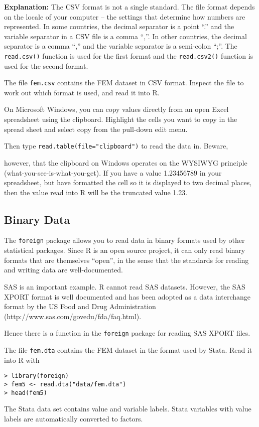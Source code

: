 \documentclass[12pt]{article}
\begin{document}
\textbf{Explanation:} The CSV format is not a single standard. The file format depends on
the locale of your computer – the settings that determine how numbers are
represented. In some countries, the decimal separator is a point “.” and the variable
separator in a CSV file is a comma “,”. In other countries, the decimal separator is a
comma “,” and the variable separator is a semi-colon “;”. The \texttt{read.csv()} function is
used for the first format and the \texttt{read.csv2()} function is used for the second format.


The file \texttt{fem.csv} contains the FEM dataset in CSV format. Inspect the file to work out which
format is used, and read it into R.

On Microsoft Windows, you can copy values directly from an open Excel spreadsheet using the clipboard. Highlight the cells you want to copy in the spread sheet and select copy from the
pull-down edit menu. 

Then type \texttt{read.table(file="clipboard")} to read the data in. Beware,

however, that the clipboard on Windows operates on the WYSIWYG principle
(what-you-see-is-what-you-get). If you have a value 1.23456789 in your spreadsheet, but have formatted the cell so it is displayed to two decimal places, then the value read into R will be the
truncated value 1.23.

\subsection{Binary Data}
The \texttt{foreign} package allows you to read data in binary formats used by other statistical packages.
Since R is an open source project, it can only read binary formats that are themselves “open”, in
the sense that the standards for reading and writing data are well-documented. 

SAS is an important example. R cannot read SAS datasets. However, the SAS XPORT format is well documented and has been adopted as a data interchange format by the US Food and Drug Administration (http://www.sas.com/govedu/fda/faq.html). 

Hence there is a function in the
\texttt{foreign} package for reading SAS XPORT files.

The file \texttt{fem.dta} contains the FEM dataset in the format used by Stata. Read it into R with

\begin{verbatim}
> library(foreign)
> fem5 <- read.dta("data/fem.dta")
> head(fem5)
\end{verbatim}
The Stata data set contains value and variable labels. Stata variables with value labels are
automatically converted to factors.
\end{document}
